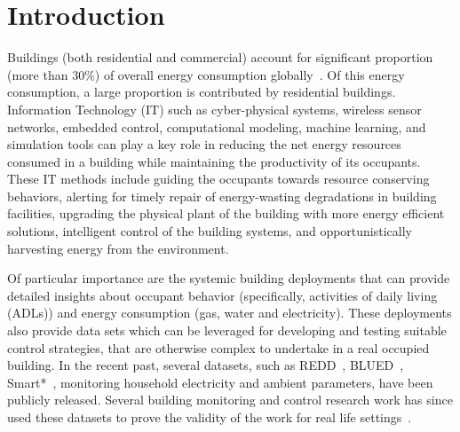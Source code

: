 \documentclass[10pt]{sensys-proc}
\begin{document}
\section{Introduction}
\label{sec:intro}
 Buildings (both residential and commercial) account for significant proportion (more than 30\%) of overall energy consumption globally~\cite{evans09india}. %
Of this energy consumption, a large proportion is contributed by residential buildings. %
Information Technology (IT) such as cyber-physical systems, wireless sensor networks, embedded control, computational modeling, machine learning, and simulation tools can play a key role in reducing the net energy resources consumed in a building while maintaining the productivity of its occupants. These IT methods include guiding the occupants towards resource conserving behaviors, alerting for timely repair of energy-wasting degradations in building facilities, upgrading the physical plant of the building with more energy efficient solutions, intelligent control of the building systems, and opportunistically harvesting energy from the environment.
 
 Of particular importance are the systemic building deployments that can provide detailed insights about occupant behavior (specifically, activities of daily living (ADLs)) and energy consumption (gas, water and electricity). These deployments also provide data sets which can be leveraged for developing and testing suitable control strategies, that are otherwise complex to undertake in a real occupied building. In the recent past, several datasets, such as REDD~\cite{redd}, BLUED~\cite{blued_cmu}, Smart*~\cite{smart}, monitoring household electricity and ambient parameters, have been publicly released. Several building monitoring and control research work has since used these datasets to prove the validity of the work for real life settings~\cite{parson2012_aaai,smartcap}.  
\end{document}
